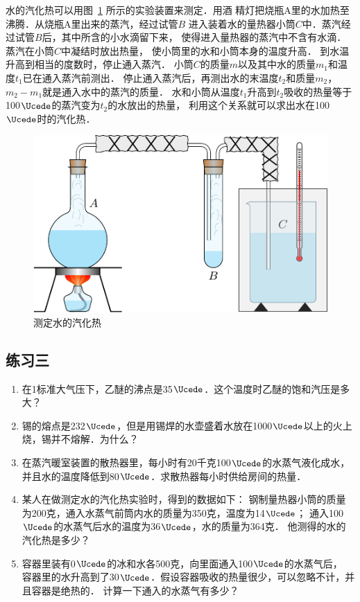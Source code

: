水的汽化热可以用图~\ref{fig_B_5-8} 所示的实验装置来测定．用酒
精灯把烧瓶A里的水加热至沸腾．从烧瓶A里出来的蒸汽，经过试管$B$
进入装着水的量热器小筒$C$中．蒸汽经过试管$B$后，其中所含的小水滴留下来，
使得进入量热器的蒸汽中不含有水滴．蒸汽在小筒$C$中凝结时放出热量，
使小筒里的水和小筒本身的温度升高．
到水温升高到相当的度数时，停止通入蒸汽．
小筒$C$的质量$m$以及其中水的质量$m_1$和温度$t_1$已在通入蒸汽前测出．
停止通入蒸汽后，再测出水的末温度$t_2$和质量$m_2$，$m_2-m_1$就是通入水中的蒸汽的质量．
水和小筒从温度$t_1$升高到$t_2$吸收的热量等于100$\Ucede$的蒸汽变为$t_2$的水放出的热量，
利用这个关系就可以求出水在100$\Ucede$时的汽化热．

\begin{figure}[htbp]
	\centering
	\includegraphics{fig/B/5-8.pdf}
	\caption{测定水的汽化热}\label{fig_B_5-8}
\end{figure}


\subsection*{练习三}
\begin{enumerate}
\item 在1标准大气压下，乙醚的沸点是35$\Ucede$．这个温度时乙醚的饱和汽压是多大？
\item 锡的熔点是232$\Ucede$，但是用锡焊的水壶盛着水放在1000$\Ucede$以上的火上烧，锡并不熔解．为什么？
\item 在蒸汽暖室装置的散热器里，每小时有20千克100$\Ucede$的水蒸气液化成水，
并且水的温度降低到80$\Ucede$．求散热器每小时供给房间的热量．
\item 某人在做测定水的汽化热实验时，得到的数据如下：
钢制量热器小筒的质量为200克，通入水蒸气前筒内水的质量为350克，温度为14$\Ucede$；
通入100$\Ucede$的水蒸气后水的温度为36$\Ucede$，水的质量为364克．
他测得的水的汽化热是多少？
\item 容器里装有0$\Ucede$的冰和水各500克，向里面通入100$\Ucede$的水蒸气后，
容器里的水升高到了30$\Ucede$．假设容器吸收的热量很少，可以忽略不计，并且容器是绝热的．
计算一下通入的水蒸气有多少？
\end{enumerate}

